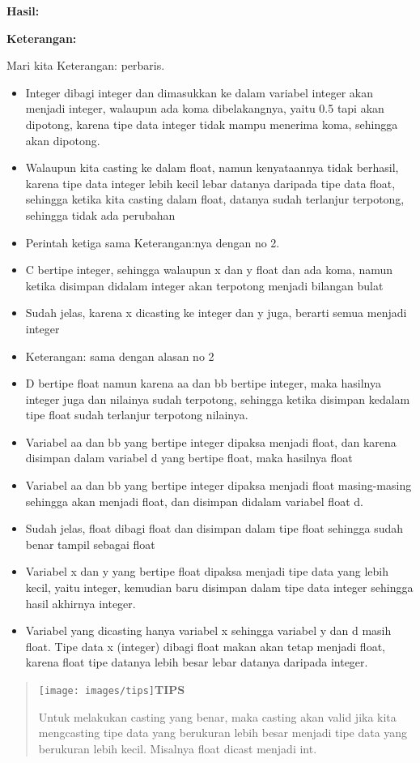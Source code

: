 \textbf{Hasil:}

\textbf{Keterangan:}

Mari kita Keterangan: perbaris.

\begin{itemize}

\item
  Integer dibagi integer dan dimasukkan ke dalam variabel integer akan
  menjadi integer, walaupun ada koma dibelakangnya, yaitu 0.5 tapi akan
  dipotong, karena tipe data integer tidak mampu menerima koma, sehingga
  akan dipotong.
\item
  Walaupun kita casting ke dalam float, namun kenyataannya tidak
  berhasil, karena tipe data integer lebih kecil lebar datanya daripada
  tipe data float, sehingga ketika kita casting dalam float, datanya
  sudah terlanjur terpotong, sehingga tidak ada perubahan
\item
  Perintah ketiga sama Keterangan:nya dengan no 2.
\item
  C bertipe integer, sehingga walaupun x dan y float dan ada koma, namun
  ketika disimpan didalam integer akan terpotong menjadi bilangan bulat
\item
  Sudah jelas, karena x dicasting ke integer dan y juga, berarti semua
  menjadi integer
\item
  Keterangan: sama dengan alasan no 2
\item
  D bertipe float namun karena aa dan bb bertipe integer, maka hasilnya
  integer juga dan nilainya sudah terpotong, sehingga ketika disimpan
  kedalam tipe float sudah terlanjur terpotong nilainya.
\item
  Variabel aa dan bb yang bertipe integer dipaksa menjadi float, dan
  karena disimpan dalam variabel d yang bertipe float, maka hasilnya
  float
\item
  Variabel aa dan bb yang bertipe integer dipaksa menjadi float
  masing-masing sehingga akan menjadi float, dan disimpan didalam
  variabel float d.
\item
  Sudah jelas, float dibagi float dan disimpan dalam tipe float sehingga
  sudah benar tampil sebagai float
\item
  Variabel x dan y yang bertipe float dipaksa menjadi tipe data yang
  lebih kecil, yaitu integer, kemudian baru disimpan dalam tipe data
  integer sehingga hasil akhirnya integer.
\item
  Variabel yang dicasting hanya variabel x sehingga variabel y dan d
  masih float. Tipe data x (integer) dibagi float makan akan tetap
  menjadi float, karena float tipe datanya lebih besar lebar datanya
  daripada integer.
\end{itemize}
\begin{quotation}
\texttt{[image: images/tips]}\textbf{TIPS} 
	
Untuk melakukan casting yang benar, maka casting akan valid jika kita mengcasting tipe data yang berukuran lebih besar menjadi tipe data yang berukuran lebih kecil. Misalnya float dicast menjadi int.
\end{quotation}


